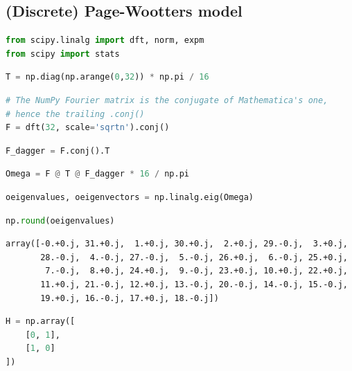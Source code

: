 \hypertarget{discrete-page-wootters-model}{%
\subsection{(Discrete) Page-Wootters
model}\label{discrete-page-wootters-model}}

\begin{lstlisting}[language=Python]
from scipy.linalg import dft, norm, expm
from scipy import stats
\end{lstlisting}

\begin{lstlisting}[language=Python]
T = np.diag(np.arange(0,32)) * np.pi / 16
\end{lstlisting}

\begin{lstlisting}[language=Python]
# The NumPy Fourier matrix is the conjugate of Mathematica's one,
# hence the trailing .conj() 
F = dft(32, scale='sqrtn').conj()
\end{lstlisting}

\begin{lstlisting}[language=Python]
F_dagger = F.conj().T
\end{lstlisting}

\begin{lstlisting}[language=Python]
Omega = F @ T @ F_dagger * 16 / np.pi
\end{lstlisting}

\begin{lstlisting}[language=Python]
oeigenvalues, oeigenvectors = np.linalg.eig(Omega)
\end{lstlisting}

\begin{lstlisting}[language=Python]
np.round(oeigenvalues)
\end{lstlisting}

\begin{lstlisting}
array([-0.+0.j, 31.+0.j,  1.+0.j, 30.+0.j,  2.+0.j, 29.-0.j,  3.+0.j,
       28.-0.j,  4.-0.j, 27.-0.j,  5.-0.j, 26.+0.j,  6.-0.j, 25.+0.j,
        7.-0.j,  8.+0.j, 24.+0.j,  9.-0.j, 23.+0.j, 10.+0.j, 22.+0.j,
       11.+0.j, 21.-0.j, 12.+0.j, 13.-0.j, 20.-0.j, 14.-0.j, 15.-0.j,
       19.+0.j, 16.-0.j, 17.+0.j, 18.-0.j])
\end{lstlisting}

\begin{lstlisting}[language=Python]
H = np.array([
    [0, 1],
    [1, 0]
])
\end{lstlisting}

